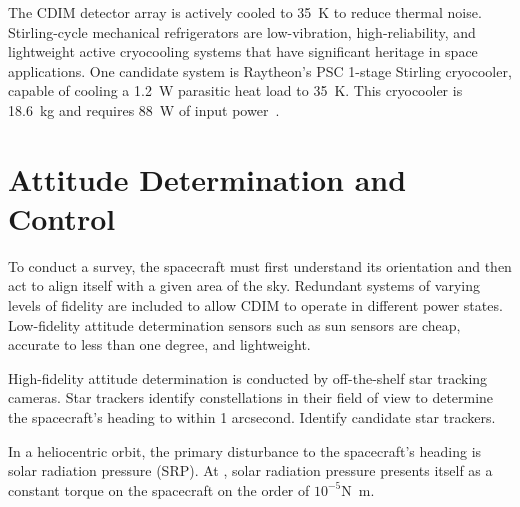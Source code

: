 \documentclass{ws-jai}
\begin{document}
The CDIM detector array is actively cooled to \SI{35}{\kelvin} to reduce thermal noise.
Stirling-cycle mechanical refrigerators are low-vibration, high-reliability, and lightweight active cryocooling systems that have significant heritage in space applications.
One candidate system is Raytheon's PSC 1-stage Stirling cryocooler, capable of cooling a \SI{1.2}{\watt} parasitic heat load to \SI{35}{\kelvin}.
This cryocooler is \SI{18.6}{\kilo\gram} and requires \SI{88}{\watt} of input power~\cite{tchandbook2003}.




\section{Attitude Determination and Control}
\label{sec:adcs}
To conduct a survey, the spacecraft must first understand its orientation and then act to align itself with a given area of the sky.
Redundant systems of varying levels of fidelity are included to allow CDIM to operate in different power states.
Low-fidelity attitude determination sensors such as sun sensors are cheap, accurate to less than one degree, and lightweight.

High-fidelity attitude determination is conducted by off-the-shelf star tracking cameras.
Star trackers identify constellations in their field of view to determine the spacecraft's heading to within 1 arcsecond.
{\color{red}Identify candidate star trackers.}

In a heliocentric orbit, the primary disturbance to the spacecraft's heading is solar radiation pressure (SRP).
At \Ltwo, solar radiation pressure presents itself as a constant torque on the spacecraft on the order of $10^{-5}$\si{\newton\meter}.
\end{document}
